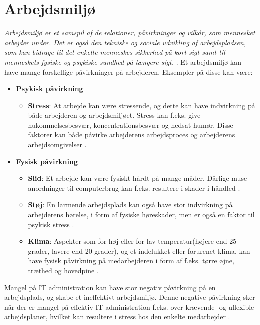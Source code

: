 \section{Arbejdsmiljø}

\textit{Arbejdsmiljø er et samspil af de relationer, påvirkninger og vilkår, som mennesket arbejder under. Det er også den tekniske og sociale udvikling af arbejdspladsen, som kan bidrage til det enkelte menneskes sikkerhed på kort sigt samt til menneskets fysiske og psykiske sundhed på længere sigt.} \citep{Arbejdsmiljoe}.
Et arbejdsmiljø kan have mange forskellige påvirkninger på arbejderen. Eksempler på disse kan være: 
\begin{itemize}
    \item {\textbf{Psykisk påvirkning} \citep{Arbejdsmiljoe_psykisk}}
    \begin{itemize}
    \item {\textbf{Stress}: At arbejde  kan være stressende, og dette kan have indvirkning på både arbejderen og arbejdsmiljøet. Stress kan f.eks. give hukommelsesbesvær, koncentrationsbesvær og nedsat humør. Disse faktorer kan både påvirke arbejderens arbejdsproces og arbejderens arbejdsomgivelser \citep{Arbejdsmiljoe_stress}.}
    \end{itemize}
    \item {\textbf{Fysisk påvirkning} \citep{Arbejdsmiljoe_fysisk}}
    \begin{itemize}
    \item {\textbf{Slid}: Et arbejde kan være fysiskt hårdt på mange måder. Dårlige muse anordninger til computerbrug kan f.eks. resultere i skader i håndled \citep{Arbejdsmiljoe_fysisk}.}
    \item {\textbf{Støj}: En larmende arbejdsplads kan også have stor indvirkning på arbejderens hørelse, i form af fysiske høreskader, men er også en faktor til psykisk stress \citep{Arbejdsmiljoe_stoej}.}
    \item {\textbf{Klima}: Aspekter som for høj eller for lav temperatur(højere end 25 grader, lavere end 20 grader), og et indelukket eller forurenet klima, kan have fysisk påvirkning på medarbejderen i form af f.eks. tørre øjne, træthed og hovedpine \citep{Arbejdsmiljoe_indeklima}.}\\
    \end{itemize}
\end{itemize}

\noindent Mangel på IT administration kan have stor negativ påvirkning på en arbejdsplads, og skabe et ineffektivt arbejdsmiljø. Denne negative påvirkning sker når der er mangel på effektiv IT administration f.eks. over-krævende- og uflexible arbejdsplaner, hvilket kan resultere i stress hos den enkelte medarbejder \citep{Cambridge2011}.

